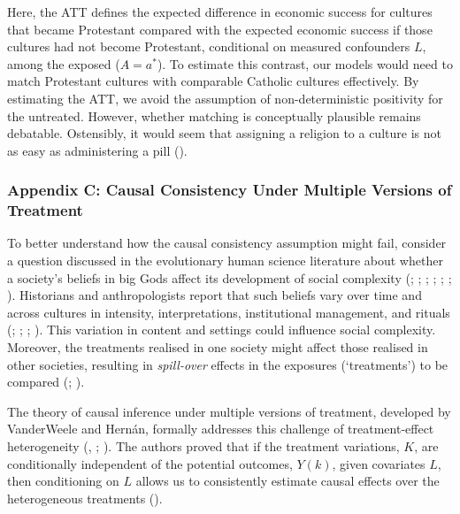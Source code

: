 \documentclass[
  single column]{article}
\begin{document}
Here, the ATT defines the expected difference in economic success for
cultures that became Protestant compared with the expected economic
success if those cultures had not become Protestant, conditional on
measured confounders \(L\), among the exposed (\(A = a^*\)). To estimate
this contrast, our models would need to match Protestant cultures with
comparable Catholic cultures effectively. By estimating the ATT, we
avoid the assumption of non-deterministic positivity for the untreated.
However, whether matching is conceptually plausible remains debatable.
Ostensibly, it would seem that assigning a religion to a culture is not
as easy as administering a pill ().

\newpage{}

\subsubsection{Appendix C: Causal Consistency Under Multiple Versions of
Treatment}\label{id-app-c}

To better understand how the causal consistency assumption might fail,
consider a question discussed in the evolutionary human science
literature about whether a society's beliefs in big Gods affect its
development of social complexity (; ;
;
;
;
;
).
Historians and anthropologists report that such beliefs vary over time
and across cultures in intensity, interpretations, institutional
management, and rituals (; ;
;
). This variation in content
and settings could influence social complexity. Moreover, the treatments
realised in one society might affect those realised in other societies,
resulting in \emph{spill-over} effects in the exposures (`treatments')
to be compared (;
).

The theory of causal inference under multiple versions of treatment,
developed by VanderWeele and Hernán, formally addresses this challenge
of treatment-effect heterogeneity
(,
;
). The
authors proved that if the treatment variations, \(K\), are
conditionally independent of the potential outcomes, \(Y(k)\), given
covariates \(L\), then conditioning on \(L\) allows us to consistently
estimate causal effects over the heterogeneous treatments
().
\end{document}
